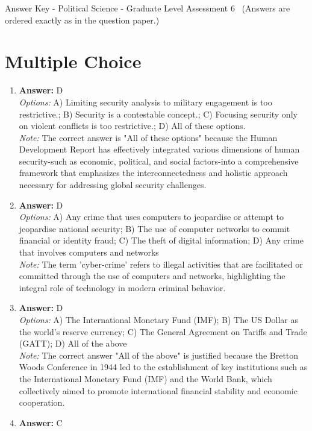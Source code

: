 \documentclass[12pt]{article}
\begin{document}
\begin{center}
Answer Key - Political Science - Graduate Level Assessment 6 \
\small (Answers are ordered exactly as in the question paper.)
\end{center}

\section*{Multiple Choice}
\begin{enumerate}[label=\arabic*.]
\item \textbf{Answer:} D
\\ \textit{Options:} A) Limiting security analysis to military engagement is too restrictive.; B) Security is a contestable concept.; C) Focusing security only on violent conflicts is too restrictive.; D) All of these options.
\\ \textit{Note:} The correct answer is "All of these options" because the Human Development Report has effectively integrated various dimensions of human security-such as economic, political, and social factors-into a comprehensive framework that emphasizes the interconnectedness and holistic approach necessary for addressing global security challenges.
\item \textbf{Answer:} D
\\ \textit{Options:} A) Any crime that uses computers to jeopardise or attempt to jeopardise national security; B) The use of computer networks to commit financial or identity fraud; C) The theft of digital information; D) Any crime that involves computers and networks
\\ \textit{Note:} The term 'cyber-crime' refers to illegal activities that are facilitated or committed through the use of computers and networks, highlighting the integral role of technology in modern criminal behavior.
\item \textbf{Answer:} D
\\ \textit{Options:} A) The International Monetary Fund (IMF); B) The US Dollar as the world's reserve currency; C) The General Agreement on Tariffs and Trade (GATT); D) All of the above
\\ \textit{Note:} The correct answer "All of the above" is justified because the Bretton Woods Conference in 1944 led to the establishment of key institutions such as the International Monetary Fund (IMF) and the World Bank, which collectively aimed to promote international financial stability and economic cooperation.
\item \textbf{Answer:} C

\end{enumerate}
\end{document}

